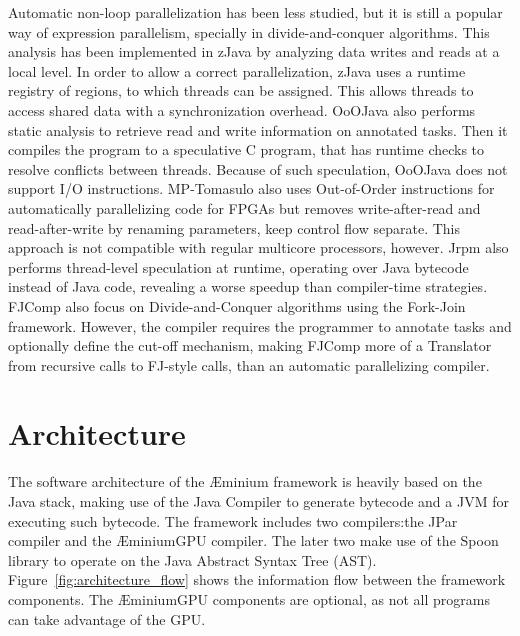 \documentclass[smallextended]{svjour3}
\begin{document}
Automatic non-loop parallelization has been less studied, but it is still a popular way of expression parallelism, specially in divide-and-conquer algorithms. This analysis has been implemented in zJava\cite{chan2004run} by analyzing data writes and reads at a local level. In order to allow a correct parallelization, zJava uses a runtime registry of regions, to which threads can be assigned. This allows threads to access shared data with a synchronization overhead. OoOJava\cite{jenista2011ooojava} also performs static analysis to retrieve read and write information on annotated tasks. Then it compiles the program to a speculative C program, that has runtime checks to resolve conflicts between threads. Because of such speculation, OoOJava does not support I/O instructions. MP-Tomasulo\cite{wang2013mp} also uses Out-of-Order instructions for automatically parallelizing code for FPGAs but removes write-after-read and read-after-write by renaming parameters, keep control flow separate. This approach is not compatible with regular multicore processors, however. Jrpm\cite{chen2003jrpm} also performs thread-level speculation at runtime, operating over Java bytecode instead of Java code, revealing a worse speedup than compiler-time strategies. FJComp\cite{senghor2013fjcomp} also focus on Divide-and-Conquer algorithms using the Fork-Join framework. However, the compiler requires the programmer to annotate tasks and optionally define the cut-off mechanism, making FJComp more of a Translator from recursive calls to FJ-style calls, than an automatic parallelizing compiler. 


\section{Architecture}
\label{sec:architecture}




The software architecture of the Æminium framework is heavily based on the Java stack, making use of the Java Compiler to generate bytecode and a JVM for executing such bytecode. The framework includes two compilers:the JPar compiler and the ÆminiumGPU compiler. The later two make use of the Spoon library\cite{spoon} to operate on the Java Abstract Syntax Tree (AST). Figure~\ref{fig:architecture_flow} shows the information flow between the framework components. The ÆminiumGPU components are optional, as not all programs can take advantage of the GPU.
\end{document}
